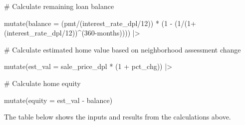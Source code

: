 \documentclass[
  letterpaper,
  DIV=11,
  numbers=noendperiod]{scrartcl}
\newenvironment{Shaded}{\begin{snugshade}}{\end{snugshade}}
\newcommand{\AttributeTok}[1]{\textcolor[rgb]{0.40,0.45,0.13}{#1}}
\newcommand{\CommentTok}[1]{\textcolor[rgb]{0.37,0.37,0.37}{#1}}
\newcommand{\DecValTok}[1]{\textcolor[rgb]{0.68,0.00,0.00}{#1}}
\newcommand{\FunctionTok}[1]{\textcolor[rgb]{0.28,0.35,0.67}{#1}}
\newcommand{\NormalTok}[1]{\textcolor[rgb]{0.00,0.23,0.31}{#1}}
\newcommand{\SpecialCharTok}[1]{\textcolor[rgb]{0.37,0.37,0.37}{#1}}
\begin{document}
\begin{Shaded}
\begin{Highlighting}[]
  \CommentTok{\# Calculate remaining loan balance}
  
  \FunctionTok{mutate}\NormalTok{(}\AttributeTok{balance =}\NormalTok{ (pmt}\SpecialCharTok{/}\NormalTok{(interest\_rate\_dpl}\SpecialCharTok{/}\DecValTok{12}\NormalTok{)) }\SpecialCharTok{*}\NormalTok{ (}\DecValTok{1} \SpecialCharTok{{-}}\NormalTok{ (}\DecValTok{1}\SpecialCharTok{/}\NormalTok{(}\DecValTok{1}\SpecialCharTok{+}\NormalTok{(interest\_rate\_dpl}\SpecialCharTok{/}\DecValTok{12}\NormalTok{))}\SpecialCharTok{\^{}}\NormalTok{(}\DecValTok{360}\SpecialCharTok{{-}}\NormalTok{months)))) }\SpecialCharTok{|\textgreater{}} 
  
  \CommentTok{\# Calculate estimated home value based on neighborhood assessment change}
  
  \FunctionTok{mutate}\NormalTok{(}\AttributeTok{est\_val =}\NormalTok{ sale\_price\_dpl }\SpecialCharTok{*}\NormalTok{ (}\DecValTok{1} \SpecialCharTok{+}\NormalTok{ pct\_chg)) }\SpecialCharTok{|\textgreater{}} 
  
  \CommentTok{\# Calculate home equity}
  
  \FunctionTok{mutate}\NormalTok{(}\AttributeTok{equity =}\NormalTok{ est\_val }\SpecialCharTok{{-}}\NormalTok{ balance)}
\end{Highlighting}
\end{Shaded}

The table below shows the inputs and results from the calculations
above.
\end{document}
